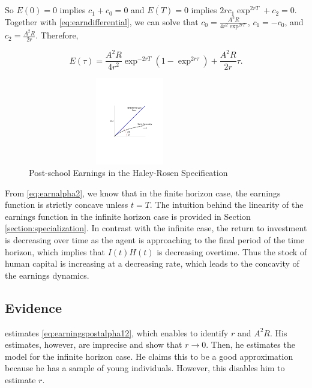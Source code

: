 \indent So $E(0)=0$ implies $c_{1} + c_{0} = 0$ and $\dot{E(T)} = 0$ implies $2rc_1 \exp^{2rT}  + c_{2} = 0$. Together with \eqref{eq:earndifferential}, we can solve that $c_0 = \frac{A^2 R}{4r^2 \exp^{2rT}}$, $c_1 = -c_0$, and $c_2 = \frac{A^2 R}{2r}$. Therefore, 

\begin{equation}
E(\tau) = \frac{A^2 R}{4r^2} \exp^{-2r T} \left( 1 - \exp^{2r \tau} \right) + \frac{A^2 R}{2r} \tau. \label{eq:earningspostalpha12}
\end{equation}

\begin{center}
\begin{figure}[H]
\caption{Post-school Earnings in the Haley-Rosen Specification}
\centering
\includegraphics[width=3.5in, height=1.5in]{Figures/fig-finite-horiz.pdf}
\end{figure}
\end{center}

\indent From \eqref{eq:earnalpha2}, we know that in the finite horizon case, the earnings function is strictly concave unless $t=T$. The intuition behind the linearity of the earnings function in the infinite horizon case is provided in Section \ref{section:specialization}. In contrast with the infinite case, the return to investment is decreasing over time as the agent is approaching to the final period of the time horizon, which implies that $I(t)H(t)$ is decreasing overtime. Thus the stock of human capital is increasing at a decreasing rate, which leads to the concavity of the earnings dynamics. 

\subsection{Evidence}
\citet{brown1976model} estimates \eqref{eq:earningspostalpha12}, which enables to identify $r$ and $A^2 R$. His estimates, however, are imprecise and show that $r \rightarrow 0$. Then, he estimates the model for the infinite horizon case. He claims this to be a good approximation because he has a sample of young individuals. However, this disables him to estimate $r$.

